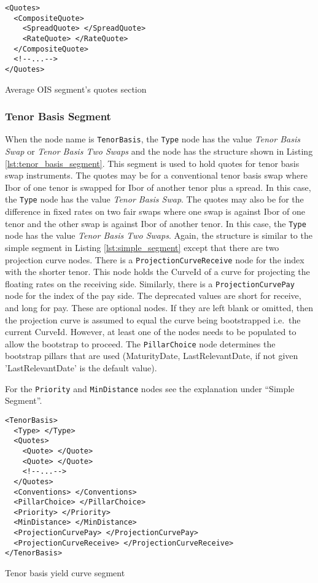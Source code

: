 \begin{listing}[H]
\begin{verbatim}
<Quotes>
  <CompositeQuote>
    <SpreadQuote> </SpreadQuote>
    <RateQuote> </RateQuote>
  </CompositeQuote>
  <!--...-->
</Quotes>
\end{verbatim}
\caption{Average OIS segment's quotes section}
\label{lst:average_ois_quotes}
\end{listing}

\subsubsection*{Tenor Basis Segment}
When the node name is \lstinline!TenorBasis!, the \lstinline!Type! node has the value \emph{Tenor Basis Swap} or
\emph{Tenor Basis Two Swaps} and the node has the structure shown in Listing \ref{lst:tenor_basis_segment}. This segment
is used to hold quotes for tenor basis swap instruments. The quotes may be for a conventional tenor basis swap where
Ibor of one tenor is swapped for Ibor of another tenor plus a spread. In this case, the \lstinline!Type! node has the
value \emph{Tenor Basis Swap}. The quotes may also be for the difference in fixed rates on two fair swaps where one swap
is against Ibor of one tenor and the other swap is against Ibor of another tenor. In this case, the \lstinline!Type!
node has the value \emph{Tenor Basis Two Swaps}. Again, the structure is similar to the simple segment in Listing
\ref{lst:simple_segment} except that there are two projection curve nodes. There is a \lstinline!ProjectionCurveReceive!
node for the index with the shorter tenor. This node holds the CurveId of a curve for projecting the floating rates on
the receiving side. Similarly, there is a \lstinline!ProjectionCurvePay! node for the index of the pay side. The deprecated 
values are short for receive, and long for pay. These are optional nodes. If they are left blank or omitted, then the projection 
curve is assumed to equal the curve being bootstrapped i.e.\ the current CurveId. However, at least one of the nodes 
needs to be populated to allow the bootstrap to proceed. The \lstinline!PillarChoice! node determines the bootstrap pillars
that are used (MaturityDate, LastRelevantDate, if not given 'LastRelevantDate' is the default value).

For the \lstinline!Priority! and \lstinline!MinDistance! nodes see the explanation under ``Simple Segment''.

\begin{listing}[H]
\begin{verbatim}
<TenorBasis>
  <Type> </Type>
  <Quotes>
    <Quote> </Quote>
    <Quote> </Quote>
    <!--...-->
  </Quotes>
  <Conventions> </Conventions>
  <PillarChoice> </PillarChoice>
  <Priority> </Priority>
  <MinDistance> </MinDistance>
  <ProjectionCurvePay> </ProjectionCurvePay>
  <ProjectionCurveReceive> </ProjectionCurveReceive>
</TenorBasis>
\end{verbatim}
\caption{Tenor basis yield curve segment}
\label{lst:tenor_basis_segment}
\end{listing}

